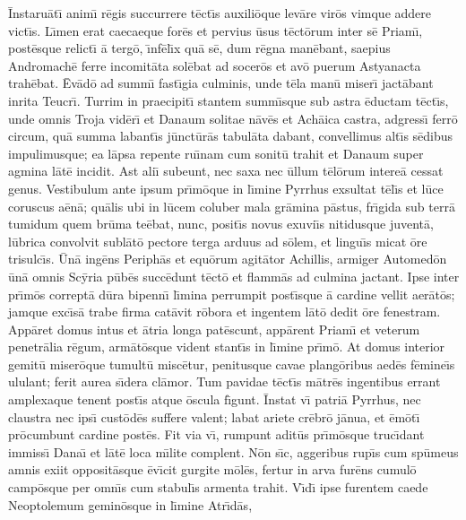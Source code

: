 \={I}nstaru\={a}t\={\i} anim\={\i} r\={e}gis succurrere t\={e}ct\={\i}s
auxili\={o}que lev\={a}re vir\={o}s vimque addere vict\={\i}s.
L\={\i}men erat caecaeque for\={e}s et pervius \={u}sus
t\={e}ct\={o}rum inter s\={e} Priam\={\i}, post\={e}sque relict\={\i}
\={a} terg\={o}, \={\i}nf\={e}l\={\i}x qu\={a} s\={e}, dum r\={e}gna man\={e}bant,
saepius Andromach\={e} ferre incomit\={a}ta sol\={e}bat
ad socer\={o}s et av\={o} puerum Astyanacta trah\={e}bat.
\={E}v\={a}d\={o} ad summ\={\i} fast\={\i}gia culminis, unde
t\={e}la man\={u} miser\={\i} jact\={a}bant inrita Teucr\={\i}.
Turrim in praecipit\={\i} stantem summ\={\i}sque sub astra 
\={e}ductam t\={e}ct\={\i}s, unde omnis Troja vid\={e}r\={\i}
et Danaum solitae n\={a}v\={e}s et Ach\={a}ica castra,
adgress\={\i} ferr\={o} circum, qu\={a} summa labant\={\i}s
j\={u}nct\={u}r\={a}s tabul\={a}ta dabant, convellimus alt\={\i}s
s\={e}dibus impulimusque; ea l\={a}psa repente ru\={\i}nam
cum sonit\={u} trahit et Danaum super agmina l\={a}t\={e}
incidit. Ast ali\={\i} subeunt, nec saxa nec \={u}llum 
t\={e}l\={o}rum intere\={a} cessat genus.
Vestibulum ante ipsum pr\={\i}m\={o}que in l\={\i}mine Pyrrhus
exsultat t\={e}l\={\i}s et l\={u}ce coruscus a\={e}n\={a};
qu\={a}lis ubi in l\={u}cem coluber mala gr\={a}mina p\={a}stus,
fr\={\i}gida sub terr\={a} tumidum quem br\={u}ma te\={e}bat,
nunc, posit\={\i}s novus exuvi\={\i}s nitidusque juvent\={a},
l\={u}brica convolvit subl\={a}t\={o} pectore terga
arduus ad s\={o}lem, et lingu\={\i}s micat \={o}re trisulc\={\i}s.
\={U}n\={a} ing\={e}ns Periph\={a}s et equ\={o}rum agit\={a}tor Achillis,
armiger Automed\={o}n \={u}n\={a} omnis Sc\={y}ria p\={u}b\={e}s
succ\={e}dunt t\={e}ct\={o} et flamm\={a}s ad culmina jactant.
Ipse inter pr\={\i}m\={o}s corrept\={a} d\={u}ra bipenn\={\i}
l\={\i}mina perrumpit post\={\i}sque \={a} cardine vellit
aer\={a}t\={o}s; jamque exc\={\i}s\={a} trabe firma cat\={a}vit
r\={o}bora et ingentem l\={a}t\={o} dedit \={o}re fenestram.
App\={a}ret domus intus et \={a}tria longa pat\={e}scunt,
app\={a}rent Priam\={\i} et veterum penetr\={a}lia r\={e}gum,
arm\={a}t\={o}sque vident stant\={\i}s in l\={\i}mine pr\={\i}m\={o}.
At domus interior gemit\={u} miser\={o}que tumult\={u}
misc\={e}tur, penitusque cavae plang\={o}ribus aed\={e}s
f\={e}mine\={\i}s ululant; ferit aurea s\={\i}dera cl\={a}mor.
Tum pavidae t\={e}ct\={\i}s m\={a}tr\={e}s ingentibus errant
amplexaque tenent post\={\i}s atque \={o}scula f\={\i}gunt.
\={I}nstat v\={\i} patri\={a} Pyrrhus, nec claustra nec ips\={\i} 
cust\={o}d\={e}s suffere valent; labat ariete cr\={e}br\={o}
j\={a}nua, et \={e}m\={o}t\={\i} pr\={o}cumbunt cardine post\={e}s.
Fit via v\={\i}, rumpunt adit\={u}s pr\={\i}m\={o}sque truc\={\i}dant
immiss\={\i} Dana\={\i} et l\={a}t\={e} loca m\={\i}lite complent.
N\={o}n s\={\i}c, aggeribus rup\={\i}s cum sp\={u}meus amnis
exiit opposit\={a}sque \={e}v\={\i}cit gurgite m\={o}l\={e}s,
fertur in arva fur\={e}ns cumul\={o} camp\={o}sque per omn\={\i}s
cum stabul\={\i}s armenta trahit.  V\={\i}d\={\i} ipse furentem
caede Neoptolemum gemin\={o}sque in l\={\i}mine Atr\={\i}d\={a}s,